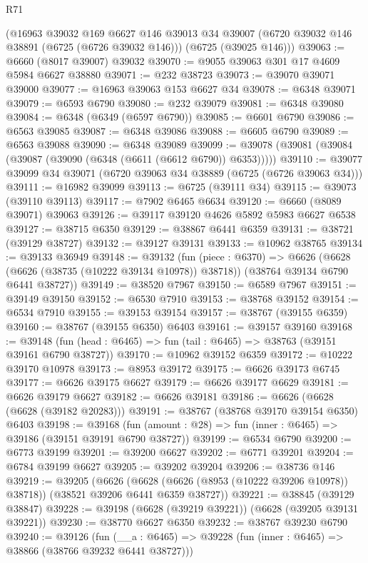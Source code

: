 \begin{lexlean}{R71}
\begin{coremodule}
    (@16963
      @39032
      @169
      @6627
      @146
      @39013
      @34
      @39007
      (@6720 @39032 @146 @38891 (@6725 (@6726 @39032 @146)))
      (@6725 (@39025 @146)))
@39063 := @6660 (@8017 @39007) @39032
@39070 := @9055 @39063 @301 @17 @4609 @5984 @6627 @38880
@39071 := @232 @38723
@39073 := @39070 @39071 @39000
@39077 := @16963 @39063 @153 @6627 @34
@39078 := @6348 @39071
@39079 := @6593 @6790
@39080 := @232 @39079
@39081 := @6348 @39080
@39084 := @6348 (@6349 (@6597 @6790))
@39085 := @6601 @6790
@39086 := @6563 @39085
@39087 := @6348 @39086
@39088 := @6605 @6790
@39089 := @6563 @39088
@39090 := @6348 @39089
@39099 := @39078 (@39081 (@39084 (@39087 (@39090 (@6348 (@6611 (@6612 @6790)) @6353)))))
@39110 := @39077 @39099 @34 @39071 (@6720 @39063 @34 @38889 (@6725 (@6726 @39063 @34)))
@39111 := @16982 @39099
@39113 := @6725 (@39111 @34)
@39115 := @39073 (@39110 @39113)
@39117 := @7902 @6465 @6634
@39120 := @6660 (@8089 @39071) @39063
@39126 := @39117 @39120 @4626 @5892 @5983 @6627 @6538
@39127 := @38715 @6350
@39129 := @38867 @6441 @6359
@39131 := @38721 (@39129 @38727)
@39132 := @39127 @39131
@39133 := @10962 @38765
@39134 := @39133 @36949
@39148 := @39132
    (fun (piece : @6370) =>
    @6626 (@6628 (@6626 (@38735 (@10222 @39134 @10978)) @38718)) (@38764 @39134 @6790 @6441 @38727))
@39149 := @38520 @7967
@39150 := @6589 @7967
@39151 := @39149 @39150
@39152 := @6530 @7910
@39153 := @38768 @39152
@39154 := @6534 @7910
@39155 := @39153 @39154
@39157 := @38767 (@39155 @6359)
@39160 := @38767 (@39155 @6350) @6403
@39161 := @39157 @39160
@39168 := @39148 (fun (head : @6465) => fun (tail : @6465) => @38763 (@39151 @39161 @6790 @38727))
@39170 := @10962 @39152 @6359
@39172 := @10222 @39170 @10978
@39173 := @8953 @39172
@39175 := @6626 @39173 @6745
@39177 := @6626 @39175 @6627
@39179 := @6626 @39177 @6629
@39181 := @6626 @39179 @6627
@39182 := @6626 @39181
@39186 := @6626 (@6628 (@6628 (@39182 @20283)))
@39191 := @38767 (@38768 @39170 @39154 @6350) @6403
@39198 := @39168 (fun (amount : @28) => fun (inner : @6465) => @39186 (@39151 @39191 @6790 @38727))
@39199 := @6534 @6790
@39200 := @6773 @39199
@39201 := @39200 @6627
@39202 := @6771 @39201
@39204 := @6784 @39199 @6627
@39205 := @39202 @39204
@39206 := @38736 @146
@39219 := @39205
    (@6626 (@6628 (@6626 (@8953 (@10222 @39206 @10978)) @38718)) (@38521 @39206 @6441 @6359 @38727))
@39221 := @38845 (@39129 @38847)
@39228 := @39198 (@6628 (@39219 @39221)) (@6628 (@39205 @39131 @39221))
@39230 := @38770 @6627 @6350
@39232 := @38767 @39230 @6790
@39240 := @39126
    (fun (__a : @6465) => @39228 (fun (inner : @6465) => @38866 (@38766 @39232 @6441 @38727)))

\end{coremodule}
\end{lexlean}
